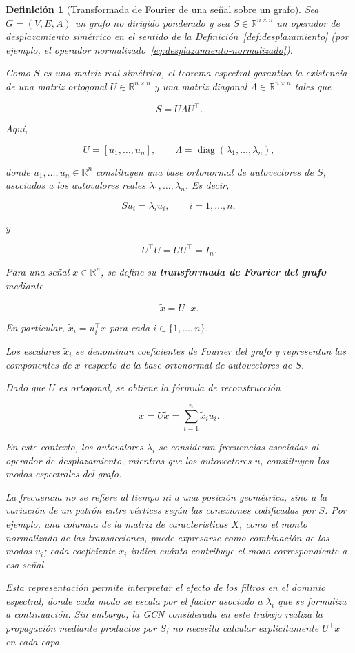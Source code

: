 \documentclass[a4paper,openany,oneside,10pt]{report}
\theoremstyle{pnlTeorema}
\theoremstyle{pnlDefinicion}
\newtheorem{definicion}{Definición}[section]
\theoremstyle{pnlObservacion}
\begin{document}
\begin{definicion}[Transformada de Fourier de una señal sobre un grafo]\label{def:fourier-grafo}
Sea \(G=(V,E,A)\) un grafo no dirigido ponderado y sea \(S\in\mathbb R^{n\times n}\) un operador de desplazamiento simétrico en el sentido de la Definición~\ref{def:desplazamiento} (por ejemplo, el operador normalizado~\eqref{eq:desplazamiento-normalizado}).

Como \(S\) es una matriz real simétrica, el teorema espectral garantiza la existencia de una matriz ortogonal \(U\in\mathbb R^{n\times n}\) y una matriz diagonal \(\Lambda\in\mathbb R^{n\times n}\) tales que

\[
S=U\Lambda U^\top.
\]

Aquí,

\[
U=[u_1,\ldots,u_n],
\qquad
\Lambda=\operatorname{diag}(\lambda_1,\ldots,\lambda_n),
\]

donde \(u_1,\ldots,u_n\in\mathbb R^n\) constituyen una base ortonormal de autovectores de \(S\), asociados a los autovalores reales \(\lambda_1,\ldots,\lambda_n\). Es decir,

\[
Su_i=\lambda_i u_i,
\qquad i=1,\ldots,n,
\]

y

\[
U^\top U=UU^\top=I_n.
\]

Para una señal \(x\in\mathbb R^n\), se define su \textbf{transformada de Fourier del grafo} mediante

\[
\widetilde x=U^\top x.
\]

En particular, \(\widetilde x_i=u_i^\top x\) para cada \(i\in\{1,\ldots,n\}\).

Los escalares \(\widetilde x_i\) se denominan \emph{coeficientes de Fourier del grafo} y representan las componentes de \(x\) respecto de la base ortonormal de autovectores de \(S\).

Dado que \(U\) es ortogonal, se obtiene la fórmula de reconstrucción

\[
x=U\widetilde x
=\sum_{i=1}^{n}\widetilde x_i u_i.
\]

En este contexto, los autovalores \(\lambda_i\) se consideran frecuencias asociadas al operador de desplazamiento, mientras que los autovectores \(u_i\) constituyen los modos espectrales del grafo.

La frecuencia no se refiere al tiempo ni a una posición geométrica, sino a la variación de un patrón entre vértices según las conexiones codificadas por \(S\). Por ejemplo, una columna de la matriz de características \(X\), como el monto normalizado de las transacciones, puede expresarse como combinación de los modos \(u_i\); cada coeficiente \(\widetilde x_i\) indica cuánto contribuye el modo correspondiente a esa señal.

Esta representación permite interpretar el efecto de los filtros en el dominio espectral, donde cada modo se escala por el factor asociado a \(\lambda_i\) que se formaliza a continuación. Sin embargo, la GCN considerada en este trabajo realiza la propagación mediante productos por \(S\); no necesita calcular explícitamente \(U^\top x\) en cada capa.

\end{definicion}
\end{document}
